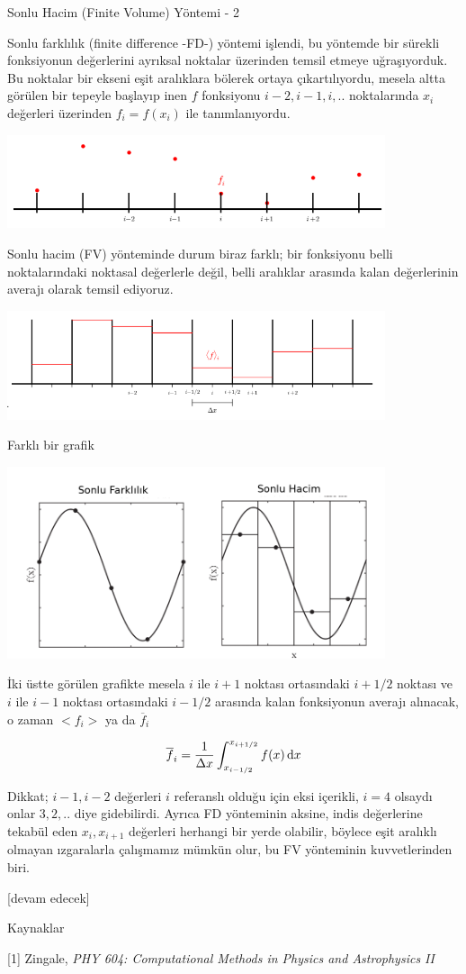 \documentclass[12pt,fleqn]{article}\usepackage{../../common}
\begin{document}
Sonlu Hacim (Finite Volume) Yöntemi - 2

Sonlu farklılık (finite difference -FD-) yöntemi işlendi, bu yöntemde bir
sürekli fonksiyonun değerlerini ayrıksal noktalar üzerinden temsil etmeye
uğraşıyorduk.  Bu noktalar bir ekseni eşit aralıklara bölerek ortaya
çıkartılıyordu, mesela altta görülen bir tepeyle başlayıp inen $f$ fonksiyonu
$i-2,i-1,i,..$ noktalarında $x_i$ değerleri üzerinden $f_i = f(x_i)$ ile
tanımlanıyordu.

\includegraphics[width=30em]{13-22-29.png}

Sonlu hacim (FV) yönteminde durum biraz farklı; bir fonksiyonu belli
noktalarındaki noktasal değerlerle değil, belli aralıklar arasında kalan
değerlerinin averajı olarak temsil ediyoruz.

\includegraphics[width=30em]{13-22-34.png}

Farklı bir grafik

\includegraphics[width=30em]{13-16-00.png}

İki üstte görülen grafikte mesela $i$ ile $i+1$ noktası ortasındaki $i+1/2$
noktası ve $i$ ile $i-1$ noktası ortasındaki $i-1/2$ arasında kalan fonksiyonun
averajı alınacak, o zaman $< f_i >$ ya da $\overline{f}_i$

$$
\overline{f}_i = \frac{1}{\Delta x} \int _{x_{i-1/2}}^{x_{i+1/2}} f(x) \,\mathrm{d} x
$$

Dikkat; $i-1,i-2$ değerleri $i$ referanslı olduğu için eksi içerikli, $i=4$
olsaydı onlar $3,2,..$ diye gidebilirdi. Ayrıca FD yönteminin aksine, indis
değerlerine tekabül eden $x_i,x_{i+1}$ değerleri herhangi bir yerde olabilir,
böylece eşit aralıklı olmayan ızgaralarla çalışmamız mümkün olur, bu FV
yönteminin kuvvetlerinden biri.




[devam edecek]
  
Kaynaklar

[1] Zingale, {\em PHY 604: Computational Methods in Physics and Astrophysics II}
\end{document}
